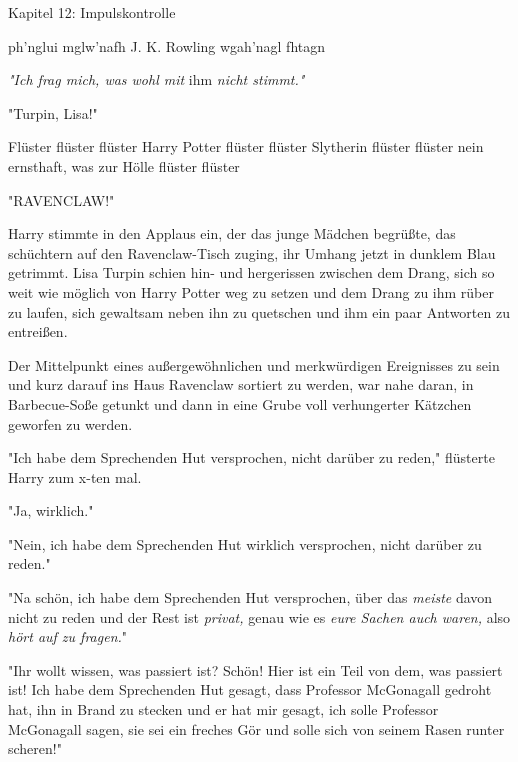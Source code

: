 

\hypertarget{impulskontrolle}{%

Kapitel 12: Impulskontrolle

ph'nglui mglw'nafh J. K. Rowling wgah'nagl fhtagn

\later

\emph{"Ich frag mich, was wohl mit} ihm \emph{nicht stimmt."}

\later

"Turpin, Lisa!"

Flüster flüster flüster Harry Potter flüster flüster Slytherin flüster flüster nein ernsthaft, was zur Hölle flüster flüster

"RAVENCLAW!"

Harry stimmte in den Applaus ein, der das junge Mädchen begrüßte, das schüchtern auf den Ravenclaw-Tisch zuging, ihr Umhang jetzt in dunklem Blau getrimmt. Lisa Turpin schien hin- und hergerissen zwischen dem Drang, sich so weit wie möglich von Harry Potter weg zu setzen und dem Drang zu ihm rüber zu laufen, sich gewaltsam neben ihn zu quetschen und ihm ein paar Antworten zu entreißen.

Der Mittelpunkt eines außergewöhnlichen und merkwürdigen Ereignisses zu sein und kurz darauf ins Haus Ravenclaw sortiert zu werden, war nahe daran, in Barbecue-Soße getunkt und dann in eine Grube voll verhungerter Kätzchen geworfen zu werden.

"Ich habe dem Sprechenden Hut versprochen, nicht darüber zu reden," flüsterte Harry zum x-ten mal.

"Ja, wirklich."

"Nein, ich habe dem Sprechenden Hut wirklich versprochen, nicht darüber zu reden."

"Na schön, ich habe dem Sprechenden Hut versprochen, über das \emph{meiste} davon nicht zu reden und der Rest ist \emph{privat,} genau wie es \emph{eure Sachen auch waren,} also \emph{hört auf zu fragen.}"

"Ihr wollt wissen, was passiert ist? Schön! Hier ist ein Teil von dem, was passiert ist! Ich habe dem Sprechenden Hut gesagt, dass Professor McGonagall gedroht hat, ihn in Brand zu stecken und er hat mir gesagt, ich solle Professor McGonagall sagen, sie sei ein freches Gör und solle sich von seinem Rasen runter scheren!"

}
